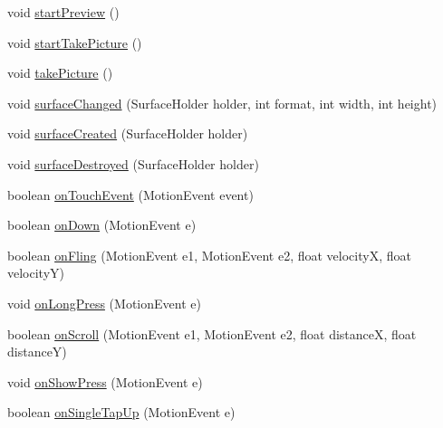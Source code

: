 \begin{DoxyCompactItemize}
\item 
void \hyperlink{classswp_1_1tuilmenau_1_1carduinodroid_1_1controller_1_1_camera_surface_af09140f0c6c04a3ab83867c9abbd4276}{start\+Preview} ()
\item 
void \hyperlink{classswp_1_1tuilmenau_1_1carduinodroid_1_1controller_1_1_camera_surface_a05163b152120d5aafe3f5d3636d067b3}{start\+Take\+Picture} ()
\item 
void \hyperlink{classswp_1_1tuilmenau_1_1carduinodroid_1_1controller_1_1_camera_surface_a1060767f277e105ef471cc9e299d94bf}{take\+Picture} ()
\item 
void \hyperlink{classswp_1_1tuilmenau_1_1carduinodroid_1_1controller_1_1_camera_surface_a13e24d8a91a594a27cd66f52725de994}{surface\+Changed} (Surface\+Holder holder, int format, int width, int height)
\item 
void \hyperlink{classswp_1_1tuilmenau_1_1carduinodroid_1_1controller_1_1_camera_surface_a714c66493b927383d94a844b742181b8}{surface\+Created} (Surface\+Holder holder)
\item 
void \hyperlink{classswp_1_1tuilmenau_1_1carduinodroid_1_1controller_1_1_camera_surface_ad8a4854496d3186224ff6a86ae1c343c}{surface\+Destroyed} (Surface\+Holder holder)
\item 
boolean \hyperlink{classswp_1_1tuilmenau_1_1carduinodroid_1_1controller_1_1_camera_surface_afd3cacc6c400724abf5c5ded882363b8}{on\+Touch\+Event} (Motion\+Event event)
\item 
boolean \hyperlink{classswp_1_1tuilmenau_1_1carduinodroid_1_1controller_1_1_camera_surface_af54a5e01c5f20ac8212954280c48785a}{on\+Down} (Motion\+Event e)
\item 
boolean \hyperlink{classswp_1_1tuilmenau_1_1carduinodroid_1_1controller_1_1_camera_surface_a2c2c30bc28a1b183bfc3e0492ea1be44}{on\+Fling} (Motion\+Event e1, Motion\+Event e2, float velocity\+X, float velocity\+Y)
\item 
void \hyperlink{classswp_1_1tuilmenau_1_1carduinodroid_1_1controller_1_1_camera_surface_a99ee0d96896cfae8a3be19ce48d61926}{on\+Long\+Press} (Motion\+Event e)
\item 
boolean \hyperlink{classswp_1_1tuilmenau_1_1carduinodroid_1_1controller_1_1_camera_surface_a1cc9dc5983675f90c16b0f64cb322e29}{on\+Scroll} (Motion\+Event e1, Motion\+Event e2, float distance\+X, float distance\+Y)
\item 
void \hyperlink{classswp_1_1tuilmenau_1_1carduinodroid_1_1controller_1_1_camera_surface_ab738bf7ace1ef2c497c39984bb585369}{on\+Show\+Press} (Motion\+Event e)
\item 
boolean \hyperlink{classswp_1_1tuilmenau_1_1carduinodroid_1_1controller_1_1_camera_surface_acc22d3ff51d7099601473ce0a26f7ab5}{on\+Single\+Tap\+Up} (Motion\+Event e)
\end{DoxyCompactItemize}


